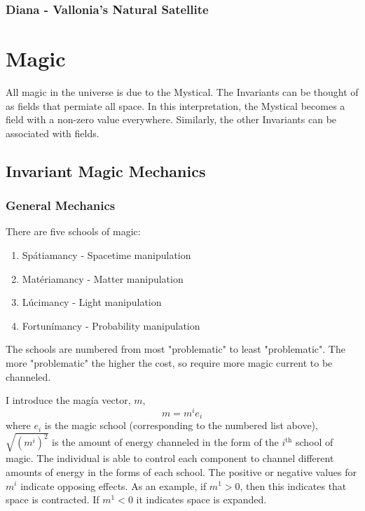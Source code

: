 \documentclass[
a4paper,
10pt,
twoside,
]{article}
\begin{document}
\subsubsection{Diana - Vallonia's Natural Satellite}

\section{Magic}

All magic in the universe is due to the Mystical.
The Invariants can be thought of as fields that permiate all space.
In this interpretation, the Mystical becomes a field with a non-zero value everywhere.
Similarly, the other Invariants can be associated with fields.

\subsection{Invariant Magic Mechanics}

\subsubsection{General Mechanics}

There are five schools of magic:
\begin{enumerate}
	\item Spátiamancy - Spacetime manipulation
	\item Matériamancy - Matter manipulation
	\item Lúcimancy - Light manipulation
	\item Fortunímancy - Probability manipulation
\end{enumerate}

The schools are numbered from most "problematic" to least "problematic".
The more "problematic" the higher the cost, so require more magic current to be channeled.

I introduce the magía vector, $m$,
\begin{equation}
	m = m^i e_i
	\label{eq : magic vector}
\end{equation}
where $e_i$ is the magic school (corresponding to the numbered list above), $\sqrt{(m^i)^2}$ is the amount of energy channeled in the form of the $i^{\text{th}}$ school of magic.
The individual is able to control each component to channel different amounts of energy in the forms of each school.
The positive or negative values for $m^i$ indicate opposing effects.
As an example, if $m^1 > 0$, then this indicates that space is contracted.
If $m^1 < 0$ it indicates space is expanded.
\end{document}
